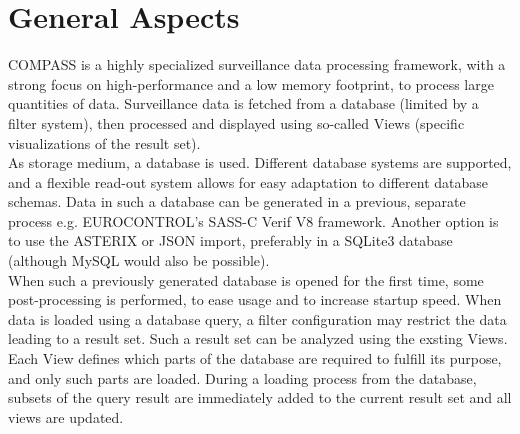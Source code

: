\section{General Aspects}
COMPASS is a highly specialized surveillance data processing framework, with a strong focus on high-performance and a low memory footprint,  to process large quantities of data. Surveillance data is fetched from a database (limited by a filter system), then processed and displayed using so-called Views (specific visualizations of the result set).\\

As storage medium, a database is used.  Different database systems are supported, and a flexible read-out system allows for easy adaptation to different database schemas.  Data in such a database can be generated in a previous, separate process e.g. EUROCONTROL's SASS-C Verif V8 framework. Another option is to use the ASTERIX or JSON import, preferably in a SQLite3 database (although MySQL would also be possible).\\

When such a previously generated database is opened for the first time, some post-processing is performed, to ease usage and to increase startup speed.  When data is loaded using a database query, a filter configuration may restrict the data leading to a result set.  Such a result set can be analyzed using the exsting Views.\\

Each View defines which parts of the database are required to fulfill its purpose, and only such parts are loaded.  During a loading process from the database, subsets of the query result are immediately added to the current result set and all views are updated.  
